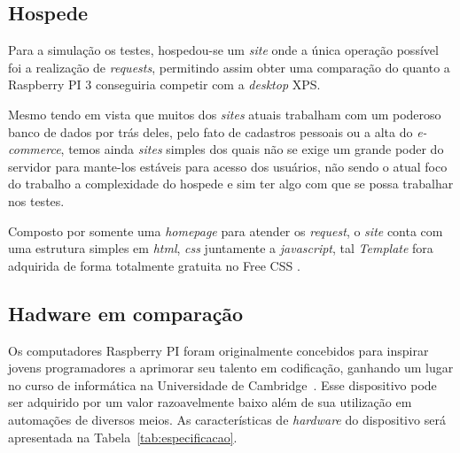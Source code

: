 \documentclass[12pt]{article}
\begin{document}
  
  \subsection{Hospede} \label{sec:site}
    
    
    Para a simulação os testes, hospedou-se um \textit{site} onde a única operação possível foi a realização de \textit{requests}, permitindo assim obter uma comparação do quanto a Raspberry PI 3 conseguiria competir com a \textit{desktop} XPS.


    Mesmo tendo em vista que muitos dos \textit{sites} atuais trabalham com um poderoso banco de dados por trás deles, pelo fato de cadastros pessoais ou a alta do \textit{e-commerce}, temos ainda \textit{sites} simples dos quais não se exige um grande poder do servidor para mante-los estáveis para acesso dos usuários, não sendo o atual foco do trabalho a complexidade do hospede e sim ter algo com que se possa trabalhar nos testes.


    Composto por somente uma \textit{homepage} para atender os \textit{request}, o \textit{site} conta com uma estrutura simples em \textit{html}, \textit{css} juntamente a \textit{javascript}, tal \textit{Template} fora adquirida de forma totalmente gratuita no Free CSS \cite{sitesFree}.



\subsection{Hadware em comparação} \label{sec:hardware}
Os computadores Raspberry PI foram originalmente concebidos para inspirar jovens programadores a aprimorar seu talento em codificação, ganhando um lugar no curso de informática na Universidade de Cambridge~\cite{pi2013raspberry}. Esse dispositivo pode ser adquirido por um valor razoavelmente baixo além de sua utilização em automações de diversos meios. As características de \textit{hardware} do dispositivo será apresentada na Tabela~\ref{tab:especificacao}.
\end{document}
